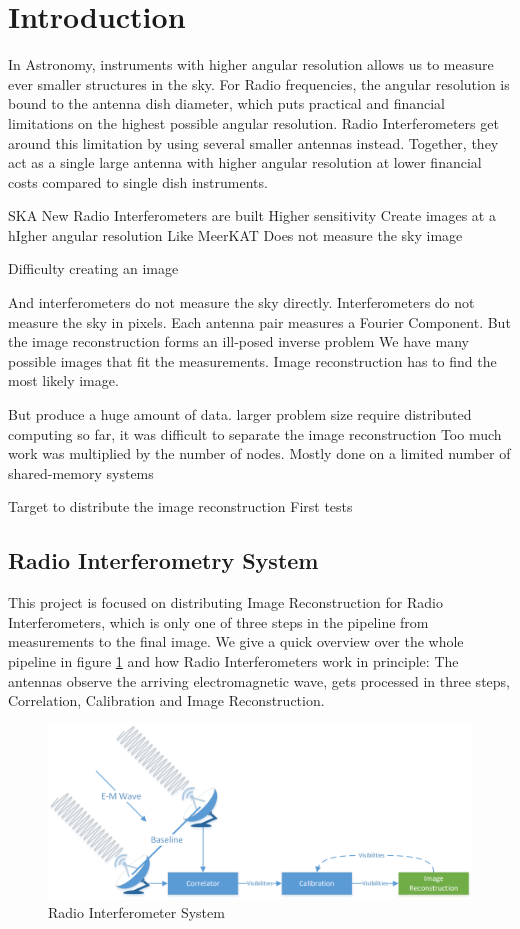 \section{Introduction}
In Astronomy, instruments with higher angular resolution allows us to measure ever smaller structures in the sky. For Radio frequencies, the angular resolution is bound to the antenna dish diameter, which puts practical and financial limitations on the highest possible angular resolution. Radio Interferometers get around this limitation by using several smaller antennas instead. Together, they act as a single large antenna with higher angular resolution at lower financial costs compared to single dish instruments.

SKA
New Radio Interferometers are built
Higher sensitivity
Create images at a hIgher angular resolution
Like MeerKAT
Does not measure the sky image

Difficulty creating an image

And interferometers do not measure the sky directly. Interferometers do not measure the sky in pixels. Each antenna pair measures a Fourier Component. 
But the image reconstruction forms an ill-posed inverse problem
We have many possible images that fit the measurements.
Image reconstruction has to find the most likely image.

But produce a huge amount of data.
larger problem size require distributed computing
so far, it was difficult to separate the image reconstruction
Too much work was multiplied by the number of nodes.
Mostly done on a limited number of shared-memory systems

Target to distribute the image reconstruction
First tests


\subsection{Radio Interferometry System}\label{intro:sys}
This project is focused on distributing Image Reconstruction for Radio Interferometers, which is only one of three steps in the pipeline from measurements to the final image. We give a quick overview over the whole pipeline in figure \ref{intro:system} and how Radio Interferometers work in principle: The antennas observe the arriving electromagnetic wave, gets processed in three steps, Correlation, Calibration and Image Reconstruction. 

\begin{figure}[h]
	\centering
	\includegraphics[width=0.80\linewidth]{./chapters/01.intro/system.png}
	\caption{Radio Interferometer System}
	\label{intro:system}
\end{figure}

